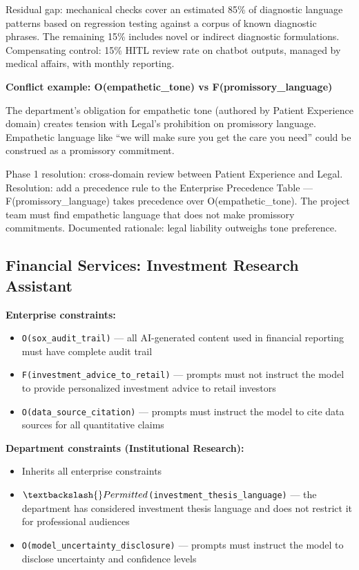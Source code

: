 Residual gap: mechanical checks cover an estimated 85\% of diagnostic language patterns based on regression testing against a corpus of known diagnostic phrases. The remaining 15\% includes novel or indirect diagnostic formulations. Compensating control: 15\% HITL review rate on chatbot outputs, managed by medical affairs, with monthly reporting.

\textbf{Conflict example: O(empathetic\_\allowbreak{}tone) vs F(promissory\_\allowbreak{}language)}

The department's obligation for empathetic tone (authored by Patient Experience domain) creates tension with Legal's prohibition on promissory language. Empathetic language like ``we will make sure you get the care you need'' could be construed as a promissory commitment.

Phase 1 resolution: cross-domain review between Patient Experience and Legal. Resolution: add a precedence rule to the Enterprise Precedence Table --- F(promissory\_\allowbreak{}language) takes precedence over O(empathetic\_\allowbreak{}tone). The project team must find empathetic language that does not make promissory commitments. Documented rationale: legal liability outweighs tone preference.

\subsection{Financial Services: Investment Research Assistant}
\label{sec:clad-examples-B-1-2}


\textbf{Enterprise constraints:}
\begin{itemize}
  \item \texttt{O(sox\_\allowbreak{}audit\_\allowbreak{}trail)} --- all AI-generated content used in financial reporting must have complete audit trail
  \item \texttt{F(investment\_\allowbreak{}advice\_\allowbreak{}to\_\allowbreak{}retail)} --- prompts must not instruct the model to provide personalized investment advice to retail investors
  \item \texttt{O(data\_\allowbreak{}source\_\allowbreak{}citation)} --- prompts must instruct the model to cite data sources for all quantitative claims
\end{itemize}


\textbf{Department constraints (Institutional Research):}
\begin{itemize}
  \item Inherits all enterprise constraints
  \item \texttt{$\textbackslash\{\}Permitted$(investment\_\allowbreak{}thesis\_\allowbreak{}language)} --- the department has considered investment thesis language and does not restrict it for professional audiences
  \item \texttt{O(model\_\allowbreak{}uncertainty\_\allowbreak{}disclosure)} --- prompts must instruct the model to disclose uncertainty and confidence levels
\end{itemize}


